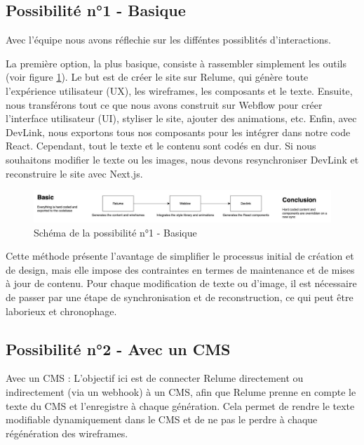 \subsection{Possibilité n°1 - Basique}

Avec l'équipe nous avons réflechie sur les difféntes possiblités d'interactions.

La première option, la plus basique, consiste à rassembler simplement les outils (voir figure \ref{fig: Schéma de la possibilité n°1 - Basique}). 
Le but est de créer le site sur Relume, qui génère toute l'expérience utilisateur (UX), les wireframes, les composants et le texte. Ensuite, nous transférons tout ce que nous avons construit sur Webflow pour créer l'interface utilisateur (UI), styliser le site, ajouter des animations, etc. Enfin, avec DevLink, nous exportons tous nos composants pour les intégrer dans notre code React. Cependant, tout le texte et le contenu sont codés en dur. Si nous souhaitons modifier le texte ou les images, nous devons resynchroniser DevLink et reconstruire le site avec Next.js.

\begin{figure}[h] 
  \centering
  \includegraphics[width=1\textwidth]{Includes/Images/connection1.png}
  \caption{Schéma de la possibilité n°1 - Basique}
  \label{fig: Schéma de la possibilité n°1 - Basique}
\end{figure} 

Cette méthode présente l'avantage de simplifier le processus initial de création et de design, mais elle impose des contraintes en termes de maintenance et de mises à jour de contenu. Pour chaque modification de texte ou d'image, il est nécessaire de passer par une étape de synchronisation et de reconstruction, ce qui peut être laborieux et chronophage.

\subsection{Possibilité n°2 - Avec un CMS}

Avec un CMS : L'objectif ici est de connecter Relume directement ou indirectement (via un webhook) à un CMS, afin que Relume prenne en compte le texte du CMS et l'enregistre à chaque génération. Cela permet de rendre le texte modifiable dynamiquement dans le CMS et de ne pas le perdre à chaque régénération des wireframes.

